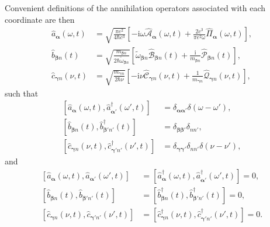 \documentclass{article}
\begin{document}
Convenient definitions of the annihilation operators associated with each coordinate are then
\begin{equation}
\begin{split}
\hat{a}_{\bm{\alpha}}(\omega,t) &= \sqrt{\frac{\pi e^2}{4\hbar c^3}}\left[-\mathrm{i}\omega\hat{\mathcal{A}}_{\bm{\alpha}}(\omega,t) + \frac{2c^3}{\pi e^2\omega}\hat{\mathit{\Pi}}_{\bm{\alpha}}(\omega,t)\right],\\
\hat{b}_{\bm{\beta}n}(t) &= \sqrt{\frac{m_{\bm{\beta}n}}{2\hbar\tilde{\omega}_{\bm{\beta}n}}}\left[\tilde{\omega}_{\bm{\beta}n}\hat{\mathcal{B}}_{\bm{\beta}n}(t) + \frac{\mathrm{i}}{m_{\bm{\beta}n}}\hat{\mathcal{P}}_{\bm{\beta}n}(t)\right],\\
\hat{c}_{\bm{\gamma}n}(\nu,t) &= \sqrt{\frac{m_{\bm{\gamma}n}}{2\hbar\nu}}\left[-\mathrm{i}\nu\hat{\mathcal{C}}_{\bm{\gamma}n}(\nu,t) + \frac{1}{m_{\bm{\gamma}n}}\hat{\mathcal{Q}}_{\bm{\gamma}n}(\nu,t)\right],
\end{split}
\end{equation}
such that
\begin{equation}
\begin{split}
\left[\hat{a}_{\bm{\alpha}}(\omega,t),\hat{a}_{\bm{\alpha}'}^\dagger(\omega',t)\right] &= \delta_{\bm{\alpha}\bm{\alpha}'}\delta(\omega - \omega'),\\
\left[\hat{b}_{\bm{\beta}n}(t),\hat{b}_{\bm{\beta}'n'}^\dagger(t)\right] &= \delta_{\bm{\beta}\bm{\beta}'}\delta_{nn'},\\
\left[\hat{c}_{\bm{\gamma}n}(\nu,t),\hat{c}_{\bm{\gamma}'n'}^\dagger(\nu',t)\right] &= \delta_{\bm{\gamma}\bm{\gamma}'}\delta_{nn'}\delta(\nu - \nu'),
\end{split}
\end{equation}
and
\begin{equation}
\begin{split}
\left[\hat{a}_{\bm{\alpha}}(\omega,t),\hat{a}_{\bm{\alpha}'}(\omega',t)\right] &= \left[\hat{a}_{\bm{\alpha}}^\dagger(\omega,t),\hat{a}_{\bm{\alpha}'}^\dagger(\omega',t)\right] = 0,\\
\left[\hat{b}_{\bm{\beta}n}(t),\hat{b}_{\bm{\beta}'n'}(t)\right] &= \left[\hat{b}_{\bm{\beta}n}^\dagger(t),\hat{b}_{\bm{\beta}'n'}^\dagger(t)\right] = 0,\\
\left[\hat{c}_{\bm{\gamma}n}(\nu,t),\hat{c}_{\bm{\gamma}'n'}(\nu',t)\right] &= \left[\hat{c}_{\bm{\gamma}n}^\dagger(\nu,t),\hat{c}_{\bm{\gamma}'n'}^\dagger(\nu',t)\right] = 0.
\end{split}
\end{equation}
\end{document}
